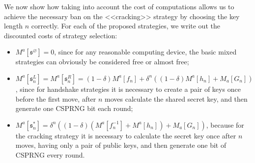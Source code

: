 We now show how taking into account the cost of computations allows us to achieve the necessary ban on the <<cracking>> strategy by choosing the key length $n$ correctly. For each of the proposed strategies, we write out the discounted costs of strategy selection: %
\begin{itemize}
	\item $M^a[\mathfrak{s}^{\varnothing}] = 0$, since for any reasonable computing device, the basic mixed strategies can obviously be considered free or almost free; %
	\item $M^a[\mathfrak{s}^L_n] = M^a[\mathfrak{s}^R_n] = (1 - \delta) M^a[f_n] + \delta ^ n ((1 - \delta) M^a[h_n] + M_a[G_n])$, since for handshake strategies it is necessary to create a pair of keys once before the first move, after $n$ moves calculate the shared secret key, and then generate one CSPRNG bit each round; %
	\item $M^a[\mathfrak{s}^*_n] = \delta ^ n ((1 - \delta) (M^a[f_n^{-1}] + M^a[h_n]) + M_a[G_n])$, because for the cracking strategy it is necessary to calculate the secret key once after $n$ moves, having only a pair of public keys, and then generate one bit of CSPRNG every round. %
\end{itemize}

